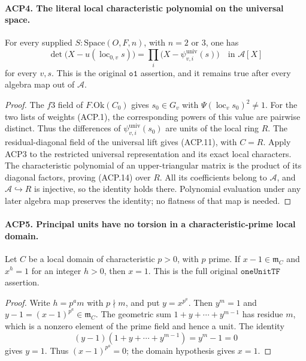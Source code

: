 \paragraph{ACP4. The literal local characteristic polynomial on the universal space.}
\label{claim:ACP4}
For every supplied \(S:\mathrm{Space}(O,F,n)\), with
\(n=2\) or \(3\), one has
\[
 \det\bigl(X-u(\operatorname{loc}_{0,v}s)\bigr)
       =\prod_i\bigl(X-\psi^{\mathrm{univ}}_{v,i}(s)\bigr)
                  \quad\text{in }\mathcal A[X]
                                                        \tag{ACP.14}
\]
for every \(v,s\).  This is the original \(\texttt{o1}\)
assertion, and it remains true after every algebra map out of
\(\mathcal A\).

\begin{proof}
The \(f3\) field of \(F.\mathrm{Ok}(C_0)\) gives
\(s_0\in G_v\) with
\(\Psi(\operatorname{loc}_v s_0)^2\ne1\).
For the two lists of weights (ACP.1), the corresponding powers
of this value are pairwise distinct.  Thus the differences of
\(\psi^{\mathrm{univ}}_{v,i}(s_0)\) are units of the local
ring \(R\).  The residual-diagonal field of the universal lift
gives (ACP.11), with \(C=R\).  Apply ACP3 to the restricted
universal representation and its exact local characters.
The characteristic polynomial of an upper-triangular matrix is
the product of its diagonal factors, proving (ACP.14) over \(R\).
All its coefficients belong to \(\mathcal A\), and
\(\mathcal A\hookrightarrow R\) is injective, so the identity
holds there.  Polynomial evaluation under any later algebra map
preserves the identity; no flatness of that map is needed.
\end{proof}

\paragraph{ACP5. Principal units have no torsion in a characteristic-prime local domain.}
\label{claim:ACP5}
Let \(C\) be a local domain of characteristic \(p>0\), with
\(p\) prime.  If \(x-1\in\mathfrak m_C\) and \(x^h=1\)
for an integer \(h>0\), then \(x=1\).
This is the full original \(\texttt{oneUnitTF}\) assertion.

\begin{proof}
Write \(h=p^am\) with \(p\nmid m\), and put \(y=x^{p^a}\).
Then \(y^m=1\) and \(y-1=(x-1)^{p^a}\in\mathfrak m_C\).
The geometric sum \(1+y+\cdots+y^{m-1}\) has residue \(m\),
which is a nonzero element of the prime field and hence a unit.
The identity
\[
          (y-1)(1+y+\cdots+y^{m-1})=y^m-1=0
\]
gives \(y=1\).  Thus \((x-1)^{p^a}=0\); the domain
hypothesis gives \(x=1\).
\end{proof}

